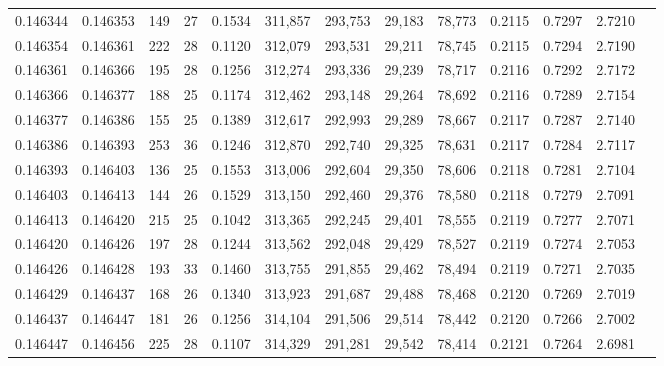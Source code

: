 \begin{tabular}{rrrrrrrrrrrrr}
0.146344 & 0.146353 & 149 &  27 &                                     0.1534 & 311,857 & 293,753 &  29,183 &  78,773 & 0.2115 & 0.7297 & 2.7210 \\
0.146354 & 0.146361 & 222 &  28 &                                     0.1120 & 312,079 & 293,531 &  29,211 &  78,745 & 0.2115 & 0.7294 & 2.7190 \\
0.146361 & 0.146366 & 195 &  28 &                                     0.1256 & 312,274 & 293,336 &  29,239 &  78,717 & 0.2116 & 0.7292 & 2.7172 \\
0.146366 & 0.146377 & 188 &  25 &                                     0.1174 & 312,462 & 293,148 &  29,264 &  78,692 & 0.2116 & 0.7289 & 2.7154 \\
0.146377 & 0.146386 & 155 &  25 &                                     0.1389 & 312,617 & 292,993 &  29,289 &  78,667 & 0.2117 & 0.7287 & 2.7140 \\
0.146386 & 0.146393 & 253 &  36 &                                     0.1246 & 312,870 & 292,740 &  29,325 &  78,631 & 0.2117 & 0.7284 & 2.7117 \\
0.146393 & 0.146403 & 136 &  25 &                                     0.1553 & 313,006 & 292,604 &  29,350 &  78,606 & 0.2118 & 0.7281 & 2.7104 \\
0.146403 & 0.146413 & 144 &  26 &                                     0.1529 & 313,150 & 292,460 &  29,376 &  78,580 & 0.2118 & 0.7279 & 2.7091 \\
0.146413 & 0.146420 & 215 &  25 &                                     0.1042 & 313,365 & 292,245 &  29,401 &  78,555 & 0.2119 & 0.7277 & 2.7071 \\
0.146420 & 0.146426 & 197 &  28 &                                     0.1244 & 313,562 & 292,048 &  29,429 &  78,527 & 0.2119 & 0.7274 & 2.7053 \\
0.146426 & 0.146428 & 193 &  33 &                                     0.1460 & 313,755 & 291,855 &  29,462 &  78,494 & 0.2119 & 0.7271 & 2.7035 \\
0.146429 & 0.146437 & 168 &  26 &                                     0.1340 & 313,923 & 291,687 &  29,488 &  78,468 & 0.2120 & 0.7269 & 2.7019 \\
0.146437 & 0.146447 & 181 &  26 &                                     0.1256 & 314,104 & 291,506 &  29,514 &  78,442 & 0.2120 & 0.7266 & 2.7002 \\
0.146447 & 0.146456 & 225 &  28 &                                     0.1107 & 314,329 & 291,281 &  29,542 &  78,414 & 0.2121 & 0.7264 & 2.6981 \\

\end{tabular}
